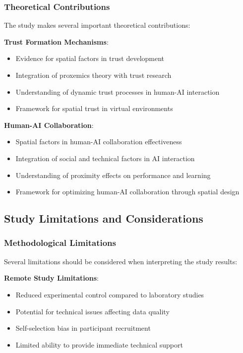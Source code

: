 \documentclass[12pt]{article}
\begin{document}
\subsubsection{Theoretical Contributions}

The study makes several important theoretical contributions:

\textbf{Trust Formation Mechanisms}:
\begin{itemize}
    \item Evidence for spatial factors in trust development
    \item Integration of proxemics theory with trust research
    \item Understanding of dynamic trust processes in human-AI interaction
    \item Framework for spatial trust in virtual environments
\end{itemize}

\textbf{Human-AI Collaboration}:
\begin{itemize}
    \item Spatial factors in human-AI collaboration effectiveness
    \item Integration of social and technical factors in AI interaction
    \item Understanding of proximity effects on performance and learning
    \item Framework for optimizing human-AI collaboration through spatial design
\end{itemize}

\subsection{Study Limitations and Considerations}

\subsubsection{Methodological Limitations}

Several limitations should be considered when interpreting the study results:

\textbf{Remote Study Limitations}:
\begin{itemize}
    \item Reduced experimental control compared to laboratory studies
    \item Potential for technical issues affecting data quality
    \item Self-selection bias in participant recruitment
    \item Limited ability to provide immediate technical support
\end{itemize}
\end{document}
